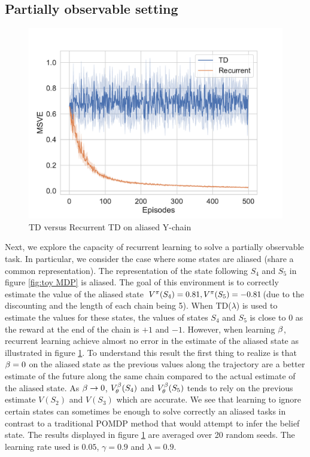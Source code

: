 \subsection{Partially observable setting}
\begin{figure}[h]
    \centering
    \includegraphics[scale=0.35]{fig/POMDP.pdf}
    \caption{TD versus Recurrent TD on aliased Y-chain}
    \label{fig:pomdp}
\end{figure}
Next, we explore the capacity of recurrent learning to solve a partially observable task. In particular, we consider the case where some states are aliased (share a common representation). The representation of the state following $S_4$ and $S_5$ in figure \ref{fig:toy MDP} is aliased. The goal of this environment is to correctly estimate the value of the aliased state $V^{\pi}(S_4)=0.81,V^{\pi}(S_5)=-0.81$(due to the discounting and the length of each chain being 5). When TD($\lambda$) is used to estimate the values for these states, the values of states $S_4$ and $S_5$ is close to 0 as the reward at the end of the chain is $+1$ and $-1$. However, when learning $\beta$, recurrent learning achieve almost no error in the estimate of the aliased state as illustrated in figure \ref{fig:pomdp}. To understand this result the first thing to realize is that $\beta=0$ on the aliased state as the previous values along the trajectory are a better estimate of the future along the same chain compared to the actual estimate of the aliased state. As $\beta \to 0$, $V^{\beta}_{\theta}(S_4)$ and $V^{\beta}_{\theta}(S_5)$ tends to rely on the previous estimate $V(S_2)$ and $V(S_3)$ which are accurate. We see that learning to ignore certain states can sometimes be enough to solve correctly an aliased tasks in contrast to a traditional POMDP method that would attempt to infer the belief state. The results displayed in figure \ref{fig:pomdp} are averaged over 20 random seeds. The learning rate used is $0.05$, $\gamma = 0.9$ and $\lambda = 0.9$.
